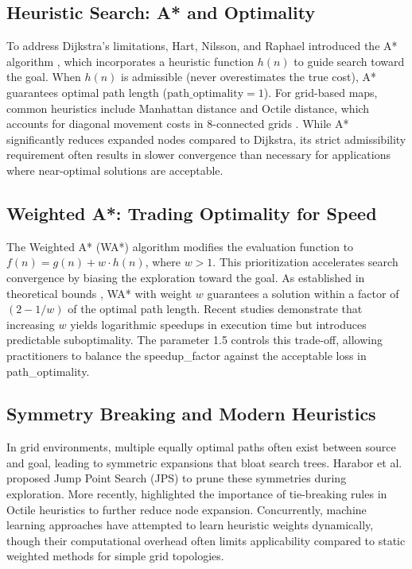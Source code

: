 \documentclass[conference]{IEEEtran}
\renewcommand{\texttt}[1]{{\normalfont\ttfamily #1}}
\begin{document}
\subsection{Heuristic Search: A* and Optimality}
To address Dijkstra's limitations, Hart, Nilsson, and Raphael introduced the A* algorithm \cite{hart1968formal}, which incorporates a heuristic function $h(n)$ to guide search toward the goal. When $h(n)$ is admissible (never overestimates the true cost), A* guarantees optimal path length ($\text{path\_optimality} = 1$). For grid-based maps, common heuristics include Manhattan distance and Octile distance, which accounts for diagonal movement costs in 8-connected grids \cite{sturtevant2012benchmarks}. While A* significantly reduces expanded nodes compared to Dijkstra, its strict admissibility requirement often results in slower convergence than necessary for applications where near-optimal solutions are acceptable.

\subsection{Weighted A*: Trading Optimality for Speed}
The Weighted A* (WA*) algorithm \cite{pohl1970heuristic} modifies the evaluation function to $f(n) = g(n) + w \cdot h(n)$, where $w > 1$. This prioritization accelerates search convergence by biasing the exploration toward the goal. As established in theoretical bounds \cite{pearl1984heuristics}, WA* with weight $w$ guarantees a solution within a factor of $(2 - 1/w)$ of the optimal path length. Recent studies \cite{felner2024weighted, goldenberg2024suboptimal} demonstrate that increasing $w$ yields logarithmic speedups in execution time but introduces predictable suboptimality. The parameter 1.5 controls this trade-off, allowing practitioners to balance the \texttt{speedup\_factor} against the acceptable loss in \texttt{path\_optimality}.

\subsection{Symmetry Breaking and Modern Heuristics}
In grid environments, multiple equally optimal paths often exist between source and goal, leading to symmetric expansions that bloat search trees. Harabor et al. \cite{harabor2011online} proposed Jump Point Search (JPS) to prune these symmetries during exploration. More recently, \cite{harabor2023heuristic} highlighted the importance of tie-breaking rules in Octile heuristics to further reduce node expansion. Concurrently, machine learning approaches \cite{agostinelli2024learned} have attempted to learn heuristic weights dynamically, though their computational overhead often limits applicability compared to static weighted methods for simple grid topologies.
\end{document}

